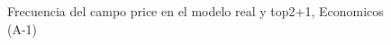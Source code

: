 \begin{figure}[H]
    \centering
    
    \caption{Frecuencia del campo  price en el modelo real y top2+1, Economicos (A-1)}
    \label{frecuency- Price-top2+1}
\end{figure}